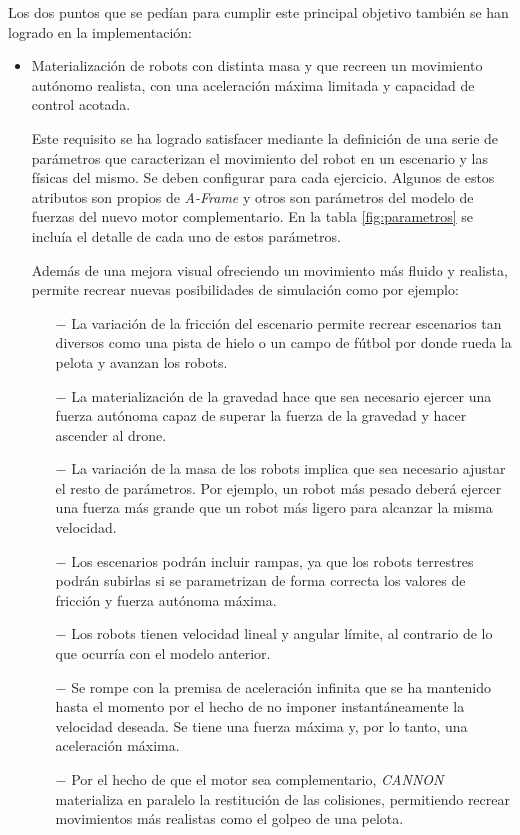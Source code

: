 Los dos puntos que se pedían para cumplir este principal objetivo también se han logrado en la implementación:

\begin{itemize}
    \item Materialización de robots con distinta masa y que recreen un movimiento autónomo realista, con una aceleración máxima limitada y capacidad de control acotada.
    
    Este requisito se ha logrado satisfacer mediante la definición de una serie de parámetros que caracterizan el movimiento del robot en un escenario y las físicas del mismo. Se deben configurar para cada ejercicio. Algunos de estos atributos son propios de \textit{A-Frame} y otros son parámetros del modelo de fuerzas del nuevo motor complementario. En la tabla \ref{fig:parametros} se incluía el detalle de cada uno de estos parámetros. \newline
    
    Además de una mejora visual ofreciendo un movimiento más fluido y realista, permite recrear nuevas posibilidades de simulación como por ejemplo:
    
    \begin{itemize}
        \item [$-$] La variación de la fricción del escenario permite recrear escenarios tan diversos como una pista de hielo o un campo de fútbol por donde rueda la pelota y avanzan los robots.
        \item [$-$] La materialización de la gravedad hace que sea necesario ejercer una fuerza autónoma capaz de superar la fuerza de la gravedad y hacer ascender al drone.
        \item [$-$] La variación de la masa de los robots implica que sea necesario ajustar el resto de parámetros. Por ejemplo, un robot más pesado deberá ejercer una fuerza más grande que un robot más ligero para alcanzar la misma velocidad.
        \item [$-$] Los escenarios podrán incluir rampas, ya que los robots terrestres podrán subirlas si se parametrizan de forma correcta los valores de fricción y fuerza autónoma máxima.
        \item [$-$] Los robots tienen velocidad lineal y angular límite, al contrario de lo que ocurría con el modelo anterior. 
        \item [$-$] Se rompe con la premisa de aceleración infinita que se ha mantenido hasta el momento por el hecho de no imponer instantáneamente la velocidad deseada. Se tiene una fuerza máxima y, por lo tanto, una aceleración máxima.
        \item [$-$] Por el hecho de que el motor sea complementario, \textit{CANNON} materializa en paralelo la restitución de las colisiones, permitiendo recrear movimientos más realistas como el golpeo de una pelota.
    \end{itemize}
    

\end{itemize}
